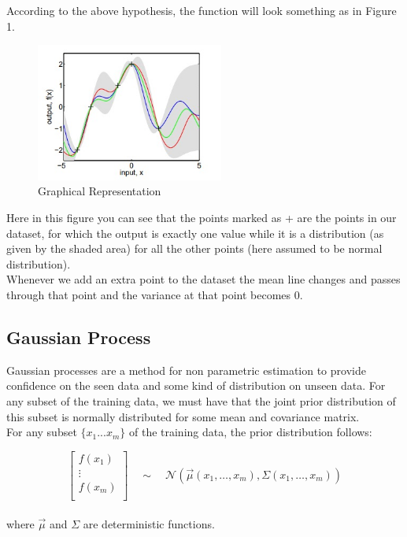 \documentclass[12pt]{article}
\begin{document}
According to the above hypothesis, the function will look something as in Figure 1.\\

\begin{figure}[!h]
    \centering
    \includegraphics[width = 0.55\textwidth]{graph.jpeg}
    \caption{Graphical Representation}
\end{figure}


Here in this figure you can see that the points marked as + are the points in our dataset, for which the output is exactly one value while it is a distribution (as given by the shaded area) for all the other points (here assumed to be normal distribution).\\

Whenever we add an extra point to the dataset the mean line changes and passes through that point and the variance at that point becomes 0.\\

\subsection{Gaussian Process}
Gaussian processes are a method for non parametric estimation to provide confidence on the seen data and some kind of distribution on unseen data. For any subset of the training data, we must have that the joint prior distribution of this subset is normally distributed for some mean and covariance matrix.\\

For any subset $\{x_1 ... x_m\}$ of the training data, the prior distribution follows:

\[
\begin{bmatrix}
    f(x_1) \\
    \vdots \\
    f(x_m) \\
\end{bmatrix}
\quad \sim \quad
\mathcal{N} (\vec{\mu} (x_1,\dots ,x_m),\Sigma (x_1,\dots,x_m) )
\]
\\
where $\vec{\mu}$ and $\Sigma$ are deterministic functions.
\end{document}
